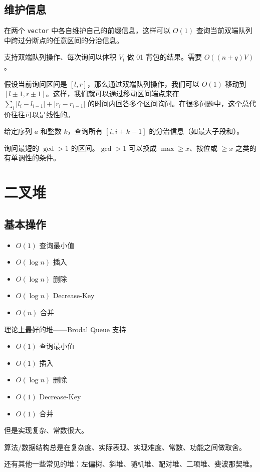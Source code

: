 \subsection{维护信息}
    在两个 \texttt{vector} 中各自维护自己的前缀信息，这样可以 $O(1)$ 查询当前双端队列中跨过分断点的任意区间的分治信息。
    \begin{example}
        支持双端队列操作、每次询问以体积 $V_i$ 做 01 背包的结果。需要 $O((n+q)V)$。
    \end{example}

    假设当前询问区间是 $[l,r]$，那么通过双端队列操作，我们可以 $O(1)$ 移动到 $[l\pm 1,r\pm 1]$。这样，我们就可以通过移动区间端点来在 $\sum_i |l_i-l_{i-1}|+|r_i-r_{i-1}|$ 的时间内回答多个区间询问。在很多问题中，这个总代价往往可以是线性的。

    \begin{example}[滑动窗口]
        给定序列 $a$ 和整数 $k$，查询所有 $[i,i+k-1]$ 的分治信息（如最大子段和）。
    \end{example}

    \begin{example}[“不删除双指针”]
        询问最短的 $\gcd>1$ 的区间。$\gcd>1$ 可以换成 $\max\ge x$、按位或 $\ge x$ 之类的有单调性的条件。
    \end{example}

\section{二叉堆}

\subsection{基本操作}

    \begin{itemize}
        \item $O(1)$ 查询最小值
        \item $O(\log n)$ 插入
        \item $O(\log n)$ 删除
        \item $O(\log n)$ Decrease-Key
        \item $O(n)$ 合并
    \end{itemize}

\begin{remark}
    理论上最好的堆——Brodal Queue 支持
    \begin{itemize}
        \item $O(1)$ 查询最小值
        \item $O(1)$ 插入
        \item $O(\log n)$ 删除
        \item $O(1)$ Decrease-Key
        \item $O(1)$ 合并
    \end{itemize}

    但是实现复杂、常数很大。

    算法/数据结构总是在复杂度、实际表现、实现难度、常数、功能之间做取舍。

    还有其他一些常见的堆：左偏树、斜堆、随机堆、配对堆、二项堆、斐波那契堆。
\end{remark}

